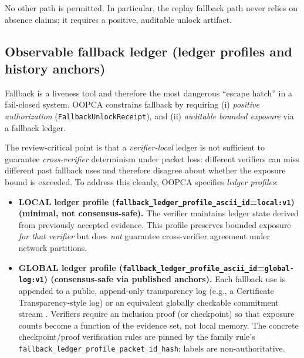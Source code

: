 \documentclass[11pt]{article}
\begin{document}
No other path is permitted.
In particular, the replay fallback path never relies on absence claims; it requires a positive, auditable unlock artifact.

\subsection{Observable fallback ledger (ledger profiles and history anchors)}\label{sec:fallback-ledger}

Fallback is a liveness tool and therefore the most dangerous ``escape hatch'' in a fail-closed system.
OOPCA constrains fallback by requiring (i) \emph{positive authorization} (\texttt{FallbackUnlockReceipt}), and (ii) \emph{auditable bounded exposure} via a fallback ledger.

The review-critical point is that a \emph{verifier-local} ledger is not sufficient to guarantee \emph{cross-verifier} determinism under packet loss: different verifiers can miss different past fallback uses and therefore disagree about whether the exposure bound is exceeded.
To address this cleanly, OOPCA specifies \emph{ledger profiles}:

\begin{itemize}[leftmargin=1.2em]
  \item \textbf{LOCAL ledger profile (\texttt{fallback\_ledger\_profile\_ascii\_id}=\texttt{local:v1}) (minimal, not consensus-safe).}
  The verifier maintains ledger state derived from previously accepted evidence.
  This profile preserves bounded exposure \emph{for that verifier} but does \emph{not} guarantee cross-verifier agreement under network partitions.
  \item \textbf{GLOBAL ledger profile (\texttt{fallback\_ledger\_profile\_ascii\_id}=\texttt{global-log:v1}) (consensus-safe via published anchors).}
  Each fallback use is appended to a public, append-only transparency log (e.g., a Certificate Transparency-style log) or an equivalent globally checkable commitment stream \cite{RFC9162}.
  Verifiers require an inclusion proof (or checkpoint) so that exposure counts become a function of the evidence set, not local memory.
  The concrete checkpoint/proof verification rules are pinned by the family rule's \texttt{fallback\_ledger\_profile\_packet\_id\_hash}; labels are non-authoritative.
\end{itemize}
\end{document}
